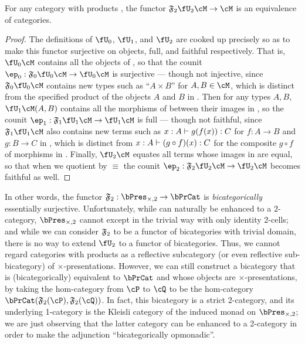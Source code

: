 \begin{thm}\label{thm:catprod-thy-esssurj}
  For any category with products \cM, the functor $\F2\fU_2\cM \to \cM$ is an equivalence of categories.
\end{thm}
\begin{proof}
  The definitions of $\fU_0$, $\fU_1$, and $\fU_2$ are cooked up precisely so as to make this functor surjective on objects, full, and faithful respectively.
  That is, $\fU_0\cM$ contains all the objects of \cM, so that the counit $\ep_0:\F{0}\fU_0\cM\to \fU_0\cM$ is surjective --- though not injective, since $\F{0}\fU_0\cM$ contains new types such as ``$A\times B$'' for $A,B\in \cM$, which is distinct from the specified product of the objects $A$ and $B$ in \cM.
  Then for any types $A,B$, $\fU_1\cM(A,B)$ contains all the morphisms of \cM between their images in \cM, so the counit $\ep_1:\F{1}\fU_1\cM\to \fU_1\cM$ is full --- though not faithful, since $\F{1}\fU_1\cM$ also contains new terms such as $x:A\vdash g(f(x)):C$ for $f:A\to B$ and $g:B\to C$ in \cM, which is distinct from $x:A\vdash (g\circ f)(x):C$ for the composite $g\circ f$ of morphisms in \cM.
  Finally, $\fU_2\cM$ equates all terms whose images in \cM are equal, so that when we quotient by $\equiv$ the counit $\ep_2:\F{2}\fU_2\cM\to \fU_2\cM$ becomes faithful as well.
\end{proof}

In other words, the functor $\F2:\timespres2 \to \bPrCat$ is \emph{bicategorically} essentially surjective.
Unfortunately, while \bPrCat can naturally be enhanced to a 2-category, $\timespres2$ cannot except in the trivial way with only identity 2-cells; and while we can consider $\mathfrak{F}_{2}$ to be a functor of bicategories with trivial domain, there is no way to extend $\fU_2$ to a functor of bicategories.
Thus, we cannot regard categories with products as a reflective subcategory (or even reflective sub-bicategory) of $\times$-presentations.
However, we can still construct a bicategory that is (bicategorically) equivalent to $\bPrCat$ and whose objects are $\times$-presentations, by taking the hom-category from $\cP$ to $\cQ$ to be the hom-category $\bPrCat(\F2(\cP),\F2(\cQ))$.
In fact, this bicategory is a strict 2-category, and its underlying 1-category is the Kleisli category of the induced monad on $\timespres2$; we are just observing that the latter category can be enhanced to a 2-category in order to make the adjunction ``bicategorically opmonadic''.

